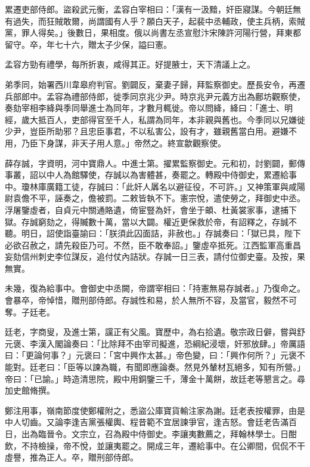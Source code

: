 \begin{pinyinscope}
 累遷吏部侍郎。盜殺武元衡，孟容白宰相曰：「漢有一汲黯，奸臣寢謀。今朝廷無有過失，而狂賊敢爾，尚謂國有人乎？願白天子，起裴中丞輔政，使主兵柄，索賊黨，罪人得矣。」後數日，果相度。俄以尚書左丞宣慰汴宋陳許河陽行營，拜東都留守。卒，年七十六，贈太子少保，謚曰憲。



 孟容方勁有禮學，每所折衷，咸得其正。好提腋士，天下清議上之。



 弟季同，始署西川韋皋府判官。劉闢反，棄妻子歸，拜監察御史。歷長安令，再遷兵部郎中。孟容為禮部侍郎，徙季同京兆少尹。時京兆尹元義方出為鄜坊觀察使，奏劾宰相李絳與季同舉進士為同年，才數月輒徙。帝以問絳，絳曰：「進士、明經，歲大抵百人，吏部得官至千人，私謂為同年，本非親與舊也。今季同以兄嫌徙少尹，豈臣所助邪？且忠臣事君，不以私害公，設有才，雖親舊當白用。避嫌不用，乃臣下身謀，非天子用人意。」帝然之。終宣歙觀察使。



 薛存誠，字資明，河中寶鼎人。中進士第。擢累監察御史。元和初，討劉闢，郵傳事叢，詔以中人為館驛使，存誠以為害體甚，奏罷之。轉殿中侍御史，累遷給事中。瓊林庫廣籍工徒，存誠曰：「此奸人羼名以避征役，不可許。」又神策軍與咸陽尉袁儋不平，誣奏之，儋被罰。二敕皆執不下。憲宗悅，遣使勞之，拜御史中丞。浮屠鑒虛者，自貞元中關通賂遺，倚宦豎為奸，會坐于頔、杜黃裳家事，逮捕下獄。存誠窮劾之，得贓數十萬，當以大闢。權近更保救於帝，有詔釋之，存誠不聽。明日，詔使詣臺諭曰：「朕須此囚面詰，非赦也。」存誠奏曰：「獄已具，陛下必欲召赦之，請先殺臣乃可。不然，臣不敢奉詔。」鑒虛卒抵死。江西監軍高重昌妄劾信州刺史李位謀反，追付仗內詰狀。存誠一日三表，請付位御史臺。及按，果無實。



 未幾，復為給事中。會御史中丞闕，帝謂宰相曰：「持憲無易存誠者。」乃復命之。會暴卒，帝悼惜，贈刑部侍郎。存誠性和易，於人無所不容，及當官，毅然不可奪。子廷老。



 廷老，字商叟，及進士第，讜正有父風。寶歷中，為右拾遺。敬宗政日僻，嘗與舒元褒、李漢入閣論奏曰：「比除拜不由宰司擬進，恐綱紀浸壞，奸邪放肆。」帝厲語曰：「更論何事？」元褒曰：「宮中興作太甚。」帝色變，曰：「興作何所？」元褒不能對。廷老曰：「臣等以諫為職，有聞即應論奏。然見外輦材瓦絕多，知有所營。」帝曰：「已諭。」時造清思院，殿中用銅鑒三千，薄金十萬餅，故廷老等懇言之。尋加史館脩撰。



 鄭注用事，嶺南節度使鄭權附之，悉盜公庫寶貨輸注家為謝。廷老表按權罪，由是中人切齒。又論李逢吉黨張權輿、程昔範不宜居諫爭官，逢吉怒。會廷老告滿百日，出為臨晉令。文宗立，召為殿中侍御史。李讓夷數薦之，拜翰林學士。日酣飲，不持檢操，帝不悅，並讓夷罷之。開成三年，遷給事中。在公卿間，侃侃不干虛譽，推為正人。卒，贈刑部侍郎。




\end{pinyinscope}
